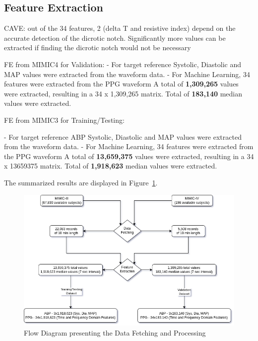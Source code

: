 \documentclass[12pt, bibliography=totoc]{scrartcl}
\begin{document}
    \subsection{Feature Extraction}
    \label{subsec:feature_extraction}

    CAVE: out of the 34 features, 2 (delta T and resistive index) depend on the accurate detection of the dicrotic notch.
    Significantly more values can be extracted if finding the dicrotic notch would not be necessary

    FE from MIMIC4 for Validation:
    - For target reference Systolic, Diastolic and MAP values were extracted from the waveform data.
    - For Machine Learning, 34 features were extracted from the PPG waveform
    A total of \textbf{1,309,265} values were extracted, resulting in a 34 x 1,309,265 matrix.
    Total of \textbf{183,140} median values were extracted.

    FE from MIMIC3 for Training/Testing:

    - For target reference ABP Systolic, Diastolic and MAP values were extracted from the waveform data.
    - For Machine Learning, 34 features were extracted from the PPG waveform
    A total of \textbf{13,659,375} values were extracted, resulting in a 34 x 13659375 matrix.
    Total of \textbf{1,918,623} median values were extracted.

    The summarized results are displayed in Figure~\ref{fig:data_flow}.

    \begin{figure}[h]
        \centering
        \includegraphics[scale=0.6]{images/flow_diagrams/flow_diagram}
        \caption{Flow Diagram presenting the Data Fetching and Processing}
        \label{fig:data_flow}
    \end{figure}
\end{document}
